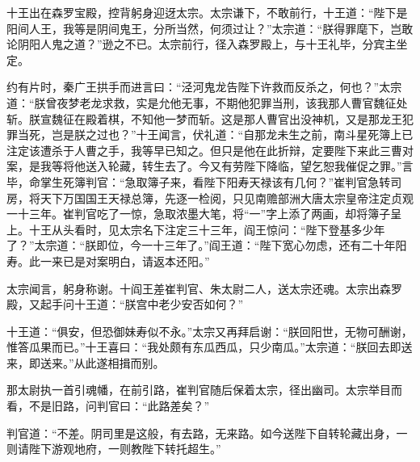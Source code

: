\documentclass[12pt]{lsbook}
\begin{document}
十王出在森罗宝殿，控背躬身迎迓太宗。太宗谦下，不敢前行，十王道：“陛下是阳间人王，我等是阴间鬼王，分所当然，何须过让？”太宗道：“朕得罪麾下，岂敢论阴阳人鬼之道？”逊之不已。太宗前行，径入森罗殿上，与十王礼毕，分宾主坐定。

约有片时，秦广王拱手而进言曰：“泾河鬼龙告陛下许救而反杀之，何也？”太宗道：“朕曾夜梦老龙求救，实是允他无事，不期他犯罪当刑，该我那人曹官魏征处斩。朕宣魏征在殿着棋，不知他一梦而斩。这是那人曹官出没神机，又是那龙王犯罪当死，岂是朕之过也？”十王闻言，伏礼道：“自那龙未生之前，南斗星死簿上已注定该遭杀于人曹之手，我等早已知之。但只是他在此折辩，定要陛下来此三曹对案，是我等将他送入轮藏，转生去了。今又有劳陛下降临，望乞恕我催促之罪。”言毕，命掌生死簿判官：“急取簿子来，看陛下阳寿天禄该有几何？”崔判官急转司房，将天下万国国王天禄总簿，先逐一检阅，只见南赡部洲大唐太宗皇帝注定贞观一十三年。崔判官吃了一惊，急取浓墨大笔，将“一”字上添了两画，却将簿子呈上。十王从头看时，见太宗名下注定三十三年，阎王惊问：“陛下登基多少年了？”太宗道：“朕即位，今一十三年了。”阎王道：“陛下宽心勿虑，还有二十年阳寿。此一来已是对案明白，请返本还阳。”

太宗闻言，躬身称谢。十阎王差崔判官、朱太尉二人，送太宗还魂。太宗出森罗殿，又起手问十王道：“朕宫中老少安否如何？”

十王道：“俱安，但恐御妹寿似不永。”太宗又再拜启谢：“朕回阳世，无物可酬谢，惟答瓜果而已。”十王喜曰：“我处颇有东瓜西瓜，只少南瓜。”太宗道：“朕回去即送来，即送来。”从此遂相揖而别。

那太尉执一首引魂幡，在前引路，崔判官随后保着太宗，径出幽司。太宗举目而看，不是旧路，问判官曰：“此路差矣？”

判官道：“不差。阴司里是这般，有去路，无来路。如今送陛下自转轮藏出身，一则请陛下游观地府，一则教陛下转托超生。”
\end{document}

